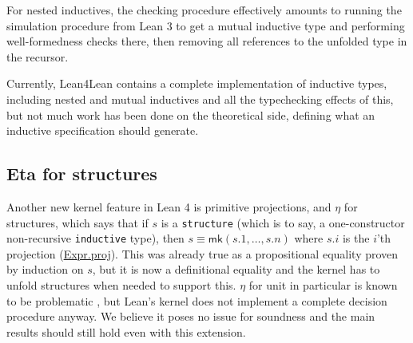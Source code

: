 \documentclass[sigplan,10pt,screen]{acmart}\settopmatter{printfolios=true,printccs=false,printacmref=false}
\newcommand{\lfl}{\textsf{Lean4Lean}\xspace}
\newcommand{\code}[1]{\mbox{\ttfamily\small #1}}
\begin{document}
For nested inductives, the checking procedure effectively amounts to running the simulation procedure from Lean 3 to get a mutual inductive type and performing well-formedness checks there, then removing all references to the unfolded type in the recursor.

Currently, \lfl contains a complete implementation of inductive types, including nested and mutual inductives and all the typechecking effects of this, but not much work has been done on the theoretical side, defining what an inductive specification should generate.

\subsection{Eta for structures}\label{sec:eta}

Another new kernel feature in Lean 4 is primitive projections, and $\eta$ for structures, which says that if $s$ is a \lstinline|structure| (which is to say, a one-constructor non-recursive \lstinline|inductive| type), then $s\equiv\mathsf{mk}(s.1,\dots,s.n)$ where $s.i$ is the $i$'th projection (\href{https://github.com/leanprover/lean4/blob/v4.20.1/src/Lean/Expr.lean#L452-L467}{\code{Expr.proj}}). This was already true as a propositional equality proven by induction on $s$, but it is now a definitional equality and the kernel has to unfold structures when needed to support this. $\eta$ for unit in particular is known to be problematic \cite{eta-unit,lennon-bertrand2022}, but Lean's kernel does not implement a complete decision procedure anyway. We believe it poses no issue for soundness and the main results should still hold even with this extension.
\end{document}
